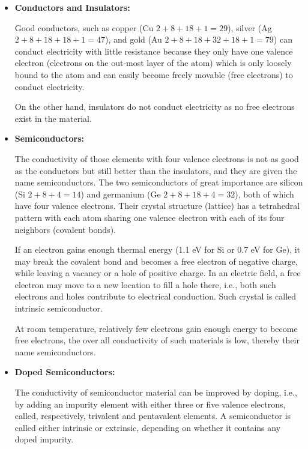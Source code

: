 \begin{itemize}
\item {\bf Conductors and Insulators:} 

Good conductors, such as copper (Cu $2+8+18+1=29$), silver (Ag $2+8+18+18+1=47$),
and gold (Au $2+8+18+32+18+1=79$) can conduct electricity with little resistance 
because they only have one valence electron (electrons on the out-most layer of 
the atom) which is only loosely bound to the atom and can easily become freely
movable (free electrons) to conduct electricity. 

On the other hand, insulators do not conduct electricity as no free electrons 
exist in the material.


\item {\bf Semiconductors:} 

The conductivity of those elements with four valence electrons is not as
good as the conductors but still better than the insulators, and they are
given the name semiconductors. The two semiconductors of great importance 
are silicon (Si $2+8+4=14$) and germanium (Ge $2+8+18+4=32$), both of which 
have four valence electrons. Their crystal structure (lattice) has a tetrahedral
pattern with each atom sharing one valence electron with each of its four 
neighbors (covalent bonds). 

If an electron gains enough thermal energy (1.1 eV for Si or 0.7 eV for
Ge), it may break the covalent bond and becomes a free electron of negative
charge, while leaving a vacancy or a hole of positive charge. In an electric
field, a free electron may move to a new location to fill a hole there, i.e.,
both such electrons and holes contribute to electrical conduction. Such 
crystal is called intrinsic semiconductor.

At room temperature, relatively few electrons gain enough energy to become
free electrons, the over all conductivity of such materials is low, thereby
their name semiconductors. 


\item {\bf Doped Semiconductors:}

The conductivity of semiconductor material can be improved by doping, i.e.,
by adding an impurity element with either three or five valence electrons,
called, respectively, trivalent and pentavalent elements. A semiconductor
is called either intrinsic or extrinsic, depending on whether it contains
any doped impurity.


\end{itemize}
